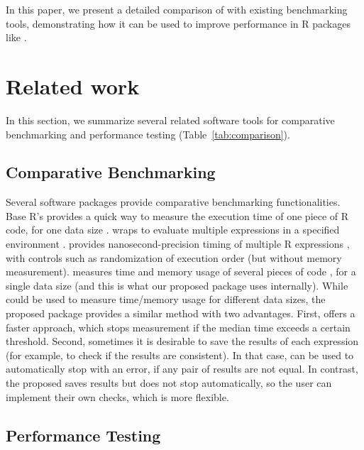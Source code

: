 In this paper, we present a detailed comparison of  with existing benchmarking tools, demonstrating how it can be used to improve performance in R packages like .


\section{Related work}
In this section, we summarize several related software tools for comparative benchmarking and performance testing
(Table~\ref{tab:comparison}).

\subsection{Comparative Benchmarking}

Several software packages provide comparative benchmarking functionalities.
Base R's  provides a quick way to measure the execution time of one piece of R code, for one data size \citep{baseR}. 
 wraps  to evaluate multiple expressions in a specified environment \citep{rbenchmark}.
 provides nanosecond-precision timing of multiple R expressions \citep{microbenchmark}, with controls such as randomization of execution order (but without memory measurement).
 measures time and memory usage of several pieces of code \citep{bench}, for a single data size (and this is what our proposed  package uses internally).
While  could be used to measure time/memory usage for different data sizes, the proposed  package provides a similar method with two advantages.
First,  offers a faster approach, which stops measurement if the median time exceeds a certain threshold. 
Second, sometimes it is desirable to save the results of each expression (for example, to check if the results are consistent).
In that case,  can be used to automatically stop with an error, if any pair of results are not equal.
In contrast, the proposed  saves results but does not stop automatically, so the user can implement their own checks, which is more flexible.

\subsection{Performance Testing}


